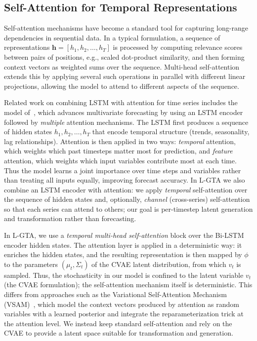 \subsection{Self-Attention for Temporal Representations}

Self-attention mechanisms have become a standard tool for capturing long-range dependencies in sequential data. In a typical formulation, a sequence of representations $\mathbf{h} = [h_1, h_2, \ldots, h_T]$ is processed by computing relevance scores between pairs of positions, e.g., scaled dot-product similarity, and then forming context vectors as weighted sums over the sequence. Multi-head self-attention extends this by applying several such operations in parallel with different linear projections, allowing the model to attend to different aspects of the sequence.

Related work on combining LSTM with attention for time series includes the model of~\cite{AIKP2023LSTMmultiattn}, which advances multivariate forecasting by using an LSTM encoder followed by \emph{multiple} attention mechanisms. The LSTM first produces a sequence of hidden states $h_1, h_2, \ldots, h_T$ that encode temporal structure (trends, seasonality, lag relationships). Attention is then applied in two ways: \emph{temporal} attention, which weights which past timesteps matter most for prediction, and \emph{feature} attention, which weights which input variables contribute most at each time. Thus the model learns a joint importance over time steps and variables rather than treating all inputs equally, improving forecast accuracy. In L-GTA we also combine an LSTM encoder with attention: we apply \emph{temporal} self-attention over the sequence of hidden states and, optionally, \emph{channel} (cross-series) self-attention so that each series can attend to others; our goal is per-timestep latent generation and transformation rather than forecasting.

In L-GTA, we use a \emph{temporal multi-head self-attention} block over the Bi-LSTM encoder hidden states. The attention layer is applied in a deterministic way: it enriches the hidden states, and the resulting representation is then mapped by $\phi$ to the parameters $(\mu_t, \Sigma_t)$ of the CVAE latent distribution, from which $v_t$ is sampled. Thus, the stochasticity in our model is confined to the latent variable $v_t$ (the CVAE formulation); the self-attention mechanism itself is deterministic. This differs from approaches such as the Variational Self-Attention Mechanism (VSAM)~\cite{8614232}, which model the context vectors produced by attention as random variables with a learned posterior and integrate the reparameterization trick at the attention level. We instead keep standard self-attention and rely on the CVAE to provide a latent space suitable for transformation and generation.